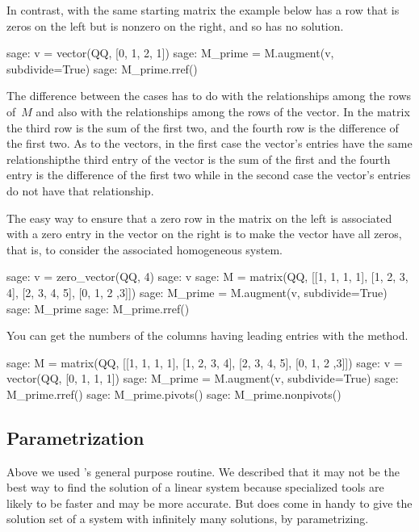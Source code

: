 In contrast, with the same starting matrix
the example below has a row that is zeros on the left but is nonzero
on the right, and so has no solution.
\begin{sagecommandline} 
sage: v = vector(QQ, [0, 1, 2, 1])             
sage: M_prime = M.augment(v, subdivide=True)
sage: M_prime.rref()                        
\end{sagecommandline}

The difference between the cases
has to do with the relationships among  
the rows of~$M$ and also with the relationships among the rows of the vector.
In the matrix
the third row is the sum of the first two, and the fourth
row is the difference of the first two.
As to the vectors, in the first case the vector's entries have the same 
relationship\Dash the third entry of the vector is the sum of the first 
and the fourth entry is the difference of the first two\Dash  
while in the second case the vector's entries do not have that relationship.

The easy way to ensure that a zero row in the matrix 
on the left is associated with a zero
entry in the vector on the right is to make the vector have all zeros, that is,
to consider the associated homogeneous system.
\begin{sagecommandline}
sage: v = zero_vector(QQ, 4)
sage: v
sage: M = matrix(QQ, [[1, 1, 1, 1], [1, 2, 3, 4], [2, 3, 4, 5], [0, 1, 2 ,3]]) 
sage: M_prime = M.augment(v, subdivide=True)
sage: M_prime
sage: M_prime.rref()
\end{sagecommandline}

You can get the numbers of the columns having leading entries with 
the  method.
\begin{sagecommandline}
sage: M = matrix(QQ, [[1, 1, 1, 1], [1, 2, 3, 4], [2, 3, 4, 5], [0, 1, 2 ,3]]) 
sage: v = vector(QQ, [0, 1, 1, 1])
sage: M_prime = M.augment(v, subdivide=True)
sage: M_prime.rref()
sage: M_prime.pivots()         
sage: M_prime.nonpivots()         
\end{sagecommandline}





\subsection{Parametrization}
Above we used \Sage's general purpose  routine.
We described that it may not be the best way to find the solution
of a linear system because specialized tools are likely to be faster and
may be more accurate. 
But  does come in handy to give the solution set of a system
with infinitely many solutions, by parametrizing.

